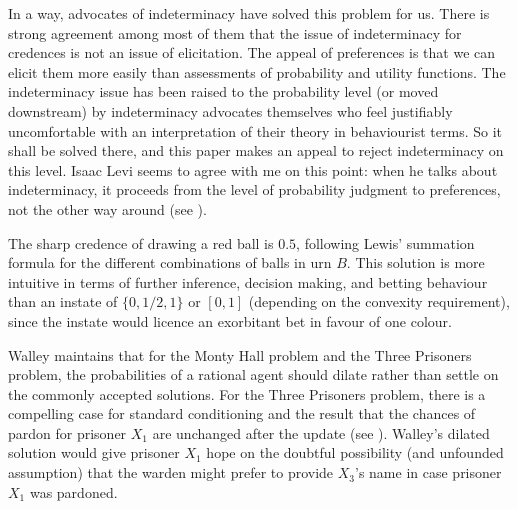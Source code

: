 \documentclass[11pt]{article}
\begin{document}
In a way, advocates of indeterminacy have solved this problem for us.
There is strong agreement among most of them that the issue of
indeterminacy for credences is not an issue of elicitation. The appeal
of preferences is that we can elicit them more easily than assessments
of probability and utility functions. The indeterminacy issue has been
raised to the probability level (or moved downstream) by indeterminacy
advocates themselves who feel justifiably uncomfortable with an
interpretation of their theory in behaviourist terms. So it shall be
solved there, and this paper makes an appeal to reject indeterminacy
on this level. Isaac Levi seems to agree with me on this point: when
he talks about indeterminacy, it proceeds from the level of
probability judgment to preferences, not the other way around (see
).


The sharp credence of drawing a red ball is $0.5$, following Lewis'
summation formula for the different combinations of balls in urn $B$.
This solution is more intuitive in terms of further inference,
decision making, and betting behaviour than an instate of
$\{0,1/2,1\}$ or $[0,1]$ (depending on the convexity requirement),
since the instate would licence an exorbitant bet in favour of one
colour.


Walley maintains that for the Monty Hall problem and the Three
Prisoners problem, the probabilities of a rational agent should dilate
rather than settle on the commonly accepted solutions. For the Three
Prisoners problem, there is a compelling case for standard
conditioning and the result that the chances of pardon for prisoner
$X_{1}$ are unchanged after the update (see
). Walley's dilated solution would give
prisoner $X_{1}$ hope on the doubtful possibility (and unfounded
assumption) that the warden might prefer to provide $X_{3}$'s name in
case prisoner $X_{1}$ was pardoned.
\end{document}
